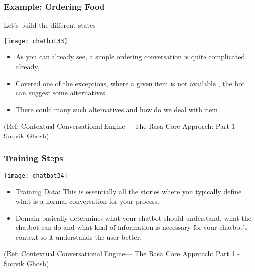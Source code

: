  \begin{frame}[fragile]\frametitle{Example: Ordering Food}
 
 Let's build the different states
 
\begin{center}
\texttt{[image: chatbot33]}

\end{center}

\begin{itemize}
\item As you can already see, a simple ordering conversation is quite complicated already, 
\item Covered one of the exceptions, where a given item is not available , the bot can suggest some alternatives. 
\item There could many such alternatives and how do we deal with item
\end{itemize}


\tiny{(Ref: Contextual Conversational Engine— The Rasa Core Approach: Part 1 - Souvik Ghosh)}

\end{frame}

 \begin{frame}[fragile]\frametitle{Training Steps}
 

\begin{center}
\texttt{[image: chatbot34]}

\end{center}

\begin{itemize}
\item Training Data: This is essentially all the stories where you typically define what is a normal conversation for your process.
\item Domain basically determines what your chatbot should understand, what the chatbot can do and what kind of information is necessary for your chatbot's context so it understands the user better. 
\end{itemize}


\tiny{(Ref: Contextual Conversational Engine— The Rasa Core Approach: Part 1 - Souvik Ghosh)}

\end{frame}

